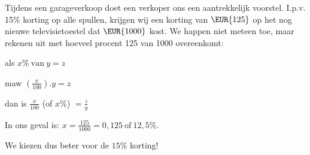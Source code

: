 \noindent Tijdens een garageverkoop doet een verkoper ons een aantrekkelijk
voorstel. I.p.v. 15\% korting op alle spullen, krijgen wij een korting
van $\EUR{125}$ op het nog nieuwe televisietoestel dat $\EUR{1000}$
kost. We happen niet meteen toe, maar rekenen uit met hoeveel procent
125 van 1000 overeenkomt:

als $x\%\:\mathrm{van}\:y=z$

maw ${\displaystyle \left(\frac{x}{100}\right).y=z}$

dan is ${\displaystyle \frac{x}{100}}$ (of $x\%$) ${\displaystyle =\frac{z}{y}}$

In ons geval is: ${\displaystyle x=\frac{125}{1000}=0,125\:\mathrm{of}\:12,5\%}$.

We kiezen dus beter voor de $15\%$ korting!
